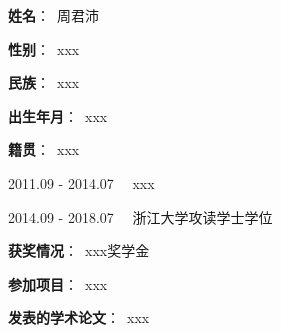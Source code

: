 
\vspace{2cm}

{
	\setlength{\parindent}{0em}
	
	\textbf{姓名}：~周君沛 
	
	\textbf{性别}：~xxx
	
	\textbf{民族}：~xxx
	
	\textbf{出生年月}：~xxx
	
	\textbf{籍贯}：~xxx
	
	\vspace{1cm}
	
	2011.09 - 2014.07 ~~xxx
	
	2014.09 - 2018.07 ~~浙江大学攻读学士学位
	
	\vspace{1cm}
	
	\textbf{获奖情况}：~xxx奖学金
	
	\textbf{参加项目}：~xxx
	
	\textbf{发表的学术论文}：~xxx

}


